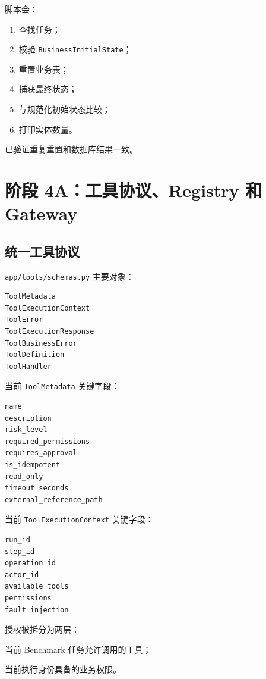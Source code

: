 \documentclass[11pt,a4paper]{ctexart}
\begin{document}
脚本会：

\begin{enumerate}[leftmargin=2.2em]
  \item 查找任务；
  \item 校验 \texttt{BusinessInitialState}；
  \item 重置业务表；
  \item 捕获最终状态；
  \item 与规范化初始状态比较；
  \item 打印实体数量。
\end{enumerate}

已验证重复重置和数据库结果一致。

\section{阶段 4A：工具协议、Registry 和 Gateway}

\subsection{统一工具协议}

\texttt{app/tools/schemas.py} 主要对象：

\begin{lstlisting}
ToolMetadata
ToolExecutionContext
ToolError
ToolExecutionResponse
ToolBusinessError
ToolDefinition
ToolHandler
\end{lstlisting}

当前 \texttt{ToolMetadata} 关键字段：

\begin{lstlisting}
name
description
risk_level
required_permissions
requires_approval
is_idempotent
read_only
timeout_seconds
external_reference_path
\end{lstlisting}

当前 \texttt{ToolExecutionContext} 关键字段：

\begin{lstlisting}
run_id
step_id
operation_id
actor_id
available_tools
permissions
fault_injection
\end{lstlisting}

授权被拆分为两层：

\begin{description}[leftmargin=3.7cm,style=nextline]
  \item[\texttt{available\_tools}]
        当前 Benchmark 任务允许调用的工具；
  \item[\texttt{permissions}]
        当前执行身份具备的业务权限。
\end{description}
\end{document}
